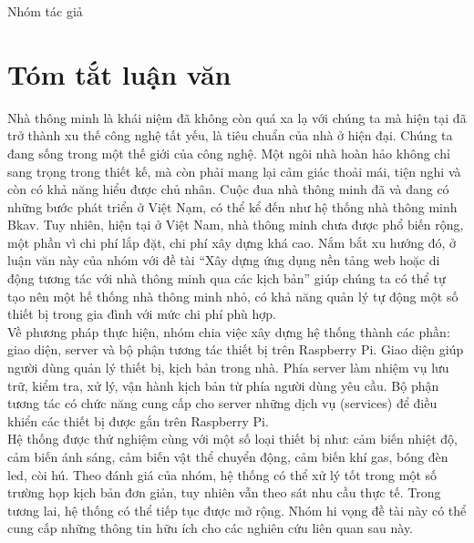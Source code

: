 \documentclass[12pt,a4paper,oneside]{extbook}
\begin{document}
\hspace{11cm}Nhóm tác giả


\chapter*{Tóm tắt luận văn}
\noindent
Nhà thông minh là khái niệm đã không còn quá xa lạ với chúng ta mà hiện tại 
đã trở thành xu thế công nghệ tất yếu, là tiêu chuẩn của nhà ở hiện đại. 
Chúng ta đang sống trong một thế giới của công nghệ. Một ngôi nhà hoàn hảo 
không chỉ sang trọng trong thiết kế, mà còn phải mang lại cảm giác thoải mái, tiện nghi và còn có khả năng hiểu được chủ nhân. Cuộc đua nhà thông minh đã và đang có những bước phát triển ở Việt Nạm, có thể kể đến như hệ thống nhà thông minh Bkav. Tuy nhiên, hiện tại ở Việt Nam, nhà thông minh chưa được phổ biến rộng, một phần vì chi phí lắp đặt, chi phí xây dựng khá cao. Nắm bắt xu hướng đó, ở luận văn này của nhóm với đề tài “Xây dựng ứng dụng nền tảng web hoặc di động tương tác với nhà thông minh qua các kịch bản” giúp chúng ta có thể tự tạo nên một hế thống nhà thông minh nhỏ, có khả năng quản lý tự động một số thiết bị trong gia đình với mức chi phí phù hợp.\\

\noindent
Về phương pháp thực hiện, nhóm chia việc xây dựng hệ thống thành các phần: giao diện, server và bộ phận tương tác thiết bị trên Raspberry Pi. Giao diện giúp người dùng quản lý thiết bị, kịch bản trong nhà. Phía server làm nhiệm vụ lưu trữ, kiểm tra, xử lý, vận hành kịch bản từ phía người dùng yêu cầu. Bộ phận tương tác có chức năng cung cấp cho server những dịch vụ (services) để điều khiển các thiết bị được gắn trên Raspberry Pi.\\

\noindent
Hệ thống được thử nghiệm cùng với một số loại thiết bị như: cảm biến nhiệt độ, cảm biến ánh sáng, cảm biến vật thể chuyển động, cảm biến khí gas, bóng đèn led, còi hú. Theo đánh giá của nhóm, hệ thống có thể xử lý tốt trong một số trường họp kịch bản đơn giản, tuy nhiên vẫn theo sát nhu cầu thực tế. Trong tương lai, hệ thống có thể tiếp tục được mở rộng. Nhóm hi vọng đề tài này có thể cung cấp những thông tin hữu ích cho các nghiên cứu liên quan sau này.

\begingroup
\let\cleardoublepage\clearpage
\tableofcontents 
% 
\endgroup
\end{document}
